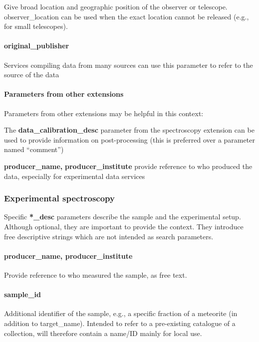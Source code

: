 \documentclass[11pt,a4paper]{ivoa}
\begin{document}
Give broad location and geographic position of the observer or telescope.
observer\_location can be used when the exact location cannot be released
(e.g., for small telescopes).

\paragraph{original\_publisher}
Services compiling data from many sources
can use this parameter to refer to the source of the data


\paragraph{Parameters from other extensions}

Parameters from other extensions may be helpful in this context:

The\textbf{ \textbf{data\_calibration\_desc}} parameter from
the spectroscopy extension can be used to provide information on
post-processing (this is preferred over a parameter named ``comment'')

\textbf{producer\_name, }\textbf{producer\_institute }provide reference
to who produced the data, especially for experimental data services

\subsubsection{Experimental spectroscopy}

Specific \textbf{*\_desc} parameters describe the sample and the
experimental setup. Although optional, they are important to provide the
context. They introduce free descriptive strings which are not intended
as search parameters.

\paragraph{producer\_name, producer\_institute}

Provide reference to who measured the sample, as free text.

\paragraph{sample\_id}

Additional identifier of the sample, e.g., a specific fraction of a meteorite
(in addition to target\_name).
Intended to refer to a pre-existing catalogue of a collection,
will therefore contain a name/ID mainly for local use.
\end{document}
